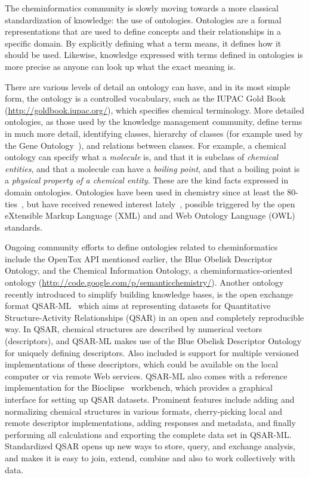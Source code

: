 \documentclass[12pt]{book}
\begin{document}
The cheminformatics community is slowly moving towards a more classical
standardization of knowledge: the use of ontologies. Ontologies are a formal
representations that are used to define concepts and their relationships in a
specific domain. By explicitly defining what a term means, it defines how
it should be used. Likewise, knowledge expressed with terms defined in
ontologies is more precise as anyone can look up what the exact meaning is.

There are various levels of detail an ontology can have, and in its most
simple form, the ontology is a controlled vocabulary, such as the IUPAC
Gold Book (\url{http://goldbook.iupac.org/}), which specifies chemical terminology.
More detailed ontologies, as those used by the knowledge management community,
define terms in much more detail, identifying classes, hierarchy of classes
(for example used by the Gene Ontology~\cite{GO2008,GO2010}), and relations
between classes. For example, a chemical ontology can specify what a \textit{molecule}
is, and that it is subclass of \textit{chemical entities}, and that a molecule can have
a \textit{boiling point}, and that a boiling point is a \textit{physical property of a chemical
entity}. These are the kind facts expressed in domain ontologies.
Ontologies have been used in chemistry since at least the 80-ties~\cite{Gordon1983},
but have received renewed interest lately~\cite{Feldman2005,Dumontier2009,Sankar2010}, possible triggered by the
open eXtensible Markup Language (XML) and and Web Ontology Language (OWL)
standards.

Ongoing community efforts to define ontologies related to cheminformatics include
the OpenTox API mentioned earlier, the Blue Obelisk Descriptor Ontology, and the
Chemical Information Ontology, a cheminformatics-oriented ontology
(\url{http://code.google.com/p/semanticchemistry/}). Another ontology
recently introduced to simplify building knowledge bases, is
the open exchange format QSAR-ML~\cite{Spjuth:2010fk} which aims at representing datasets
for Quantitative Structure-Activity Relationships (QSAR) in an open and completely
reproducible way. In QSAR, chemical structures are described by numerical vectors
(descriptors), and QSAR-ML makes use of the Blue Obelisk Descriptor Ontology for
uniquely defining descriptors. Also included is support for multiple versioned
implementations of these descriptors, which could be available on the local computer
or via remote Web services. QSAR-ML also comes with a reference implementation for
the Bioclipse~\cite{Spjuth2009,Spjuth2007} workbench, which provides a graphical
interface for setting up QSAR datasets. Prominent features include adding and
normalizing chemical structures in various formats, cherry-picking local and
remote descriptor implementations, adding responses and metadata, and finally
performing all calculations and exporting the complete data set in QSAR-ML.
Standardized QSAR opens up new ways to store, query, and exchange analysis,
and makes it is easy to join, extend, combine and also to work collectively with data.
\end{document}
